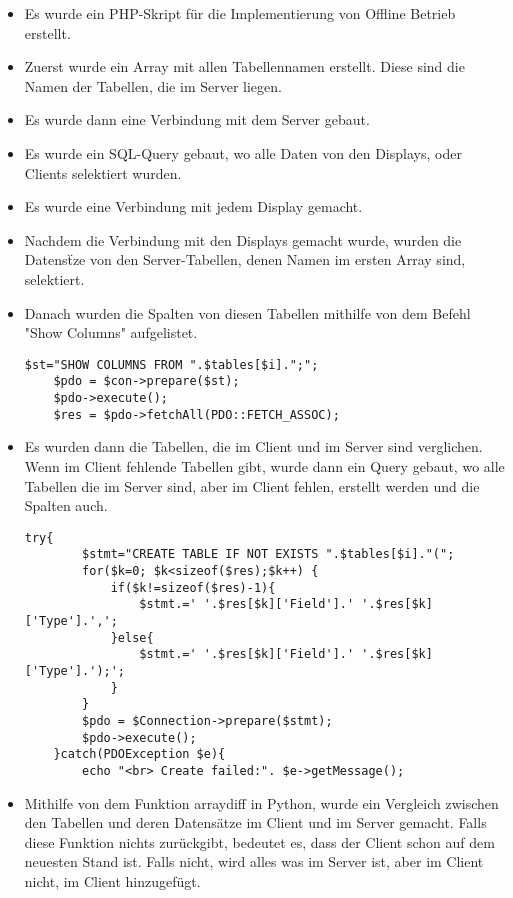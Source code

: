 \begin{itemize}
	\item Es wurde ein PHP-Skript f\"ur die Implementierung von Offline Betrieb erstellt.
	\item Zuerst wurde ein Array mit allen Tabellennamen erstellt. Diese sind die Namen der Tabellen, die im Server liegen.
	\item Es wurde dann eine Verbindung mit dem Server gebaut.
	\item Es wurde ein SQL-Query gebaut, wo alle Daten von den Displays, oder Clients selektiert wurden.
	\item Es wurde eine Verbindung mit jedem Display gemacht.
	\item Nachdem die Verbindung mit den Displays gemacht wurde, wurden die Datens\"tze von den Server-Tabellen, denen Namen im ersten Array sind, selektiert.
	\item Danach wurden die Spalten von diesen Tabellen mithilfe von dem Befehl "Show Columns" aufgelistet.
	\begin{lstlisting}[frame=single]
	$st="SHOW COLUMNS FROM ".$tables[$i].";";
	$pdo = $con->prepare($st);
	$pdo->execute();
	$res = $pdo->fetchAll(PDO::FETCH_ASSOC);
	\end{lstlisting}
	\item Es wurden dann die Tabellen, die im Client und im Server sind verglichen. Wenn im Client fehlende Tabellen gibt, wurde dann ein Query gebaut, wo alle Tabellen die im Server sind, aber im Client fehlen, erstellt werden und die Spalten auch.
	 \begin{lstlisting}[frame=single]
	 try{
	 	$stmt="CREATE TABLE IF NOT EXISTS ".$tables[$i]."(";
	 	for($k=0; $k<sizeof($res);$k++) {
	 		if($k!=sizeof($res)-1){
	 			$stmt.=' '.$res[$k]['Field'].' '.$res[$k]['Type'].',';
	 		}else{
	 			$stmt.=' '.$res[$k]['Field'].' '.$res[$k]['Type'].');';
	 		}
	 	}
	 	$pdo = $Connection->prepare($stmt);
	 	$pdo->execute();
	}catch(PDOException $e){
	 	echo "<br> Create failed:". $e->getMessage();
	 \end{lstlisting}
	 \item Mithilfe von dem Funktion arraydiff in Python, wurde ein Vergleich zwischen den Tabellen und deren Datens\"atze im Client und im Server gemacht. Falls diese Funktion nichts zur\"uckgibt, bedeutet es, dass der Client schon auf dem neuesten Stand ist. Falls nicht, wird alles was im Server ist, aber im Client nicht, im Client hinzugef\"ugt.
\end{itemize}
